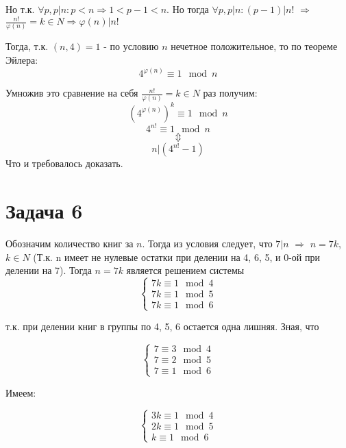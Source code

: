 \documentclass{article}
\begin{document}
		  Но т.к. $\forall p, p|n: p < n \Rightarrow 1 < p - 1 < n$. Но тогда $\forall p, p|n: (p - 1)|n! $ $\Rightarrow$ $\frac {n!}{\varphi(n)} = k \in N \Rightarrow \varphi(n) | n!$
		  
		  Тогда, т.к. $(n, 4) = 1$ - по условию $n$ нечетное положительное, то по теореме Эйлера:
		  $$ 4^{\varphi(n)} \equiv 1 \mod n $$
		  
		  Умножив это сравнение на себя $\frac {n!}{\varphi(n)} = k \in N$ раз получим:
		  $$ (4^{\varphi(n)})^{k} \equiv 1 \mod n $$
		  $$ 4^{n!} \equiv 1 \mod n $$
		  $$\Updownarrow$$
		  $$n | (4^{n!} - 1)$$		  
		  Что и требовалось доказать.
		  
		  \section {Задача 6}	
		  Обозначим количество книг за $n$. Тогда из условия следует, что $7 | n$ $\Rightarrow$ $n = 7k$, $k \in N$ (Т.к. n имеет не нулевые остатки при делении на 4, 6, 5, и 0-ой при делении на 7). Тогда $n = 7k$ является решением системы 
		  \begin{equation*} 
			  \begin{cases}
			  7k \equiv 1 \mod 4 \\
			  7k \equiv 1 \mod 5 \\
			  7k \equiv 1 \mod 6
			  \end{cases}
		  \end{equation*}
		  
		  т.к. при делении книг в группы по 4, 5, 6 остается одна лишняя. Зная, что
		  
		  \begin{equation*} 
		  \begin{cases}
		  7 \equiv 3 \mod 4 \\
		  7 \equiv 2 \mod 5 \\
		  7 \equiv 1 \mod 6
		  \end{cases}
		  \end{equation*}
		  
		  Имеем:
		  
		  \begin{equation*} 
		  \begin{cases}
		  3k \equiv 1 \mod 4 \\
		  2k \equiv 1 \mod 5 \\
		  k  \equiv 1 \mod 6
		  \end{cases}
		  \end{equation*}
		  
\end{document}
